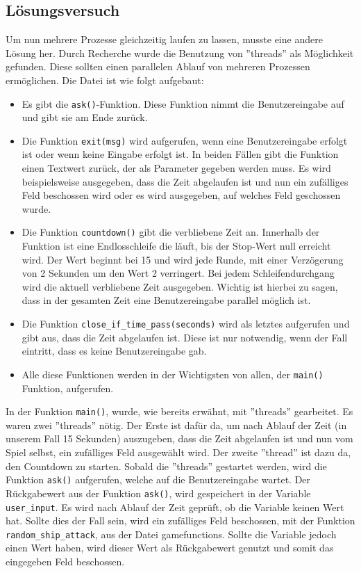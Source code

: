 \documentclass{article}
\begin{document}
\subsection{Lösungsversuch}
    Um nun mehrere Prozesse gleichzeitig laufen zu lassen, musste eine andere Lösung her. Durch Recherche wurde die Benutzung von ''threads'' als Möglichkeit gefunden. Diese sollten einen parallelen Ablauf von mehreren Prozessen ermöglichen. Die Datei ist wie folgt aufgebaut:
    \setlist{}%
\begin{itemize}
\itemsep0em
    \item
    Es gibt die \verb$ask()$-Funktion. Diese Funktion nimmt die Benutzereingabe auf und gibt sie am Ende zurück.
    \item
    Die Funktion \verb$exit(msg)$ wird aufgerufen, wenn eine Benutzereingabe erfolgt ist oder wenn keine Eingabe erfolgt ist. In beiden Fällen gibt die Funktion einen Textwert zurück, der als Parameter gegeben werden muss. Es wird beispielsweise ausgegeben, dass die Zeit abgelaufen ist und nun ein zufälliges Feld beschossen wird oder es wird ausgegeben, auf welches Feld geschossen wurde.
    \item
    Die Funktion \verb$countdown()$ gibt die verbliebene Zeit an. Innerhalb der Funktion ist eine Endlosschleife die läuft, bis der Stop-Wert null erreicht wird. Der Wert beginnt bei 15 und wird  jede Runde, mit einer Verzögerung von 2 Sekunden um den Wert 2 verringert. Bei jedem Schleifendurchgang wird die aktuell verbliebene Zeit ausgegeben. Wichtig  ist hierbei zu sagen, dass in der gesamten Zeit eine Benutzereingabe parallel möglich ist.
    \item
    Die Funktion \verb$close_if_time_pass(seconds)$ wird als letztes aufgerufen und gibt aus, dass die Zeit abgelaufen ist. Diese ist nur notwendig, wenn der Fall eintritt, dass es keine Benutzereingabe gab.
    \item
    Alle diese Funktionen werden in der Wichtigsten von allen, der \verb$main()$ Funktion, aufgerufen.
    \end{itemize}
    \par
    In der Funktion \verb$main()$, wurde, wie bereits erwähnt, mit ''threads'' gearbeitet. Es waren zwei ''threads'' nötig. Der Erste ist dafür da, um nach Ablauf der Zeit (in unserem Fall 15 Sekunden) auszugeben, dass die Zeit abgelaufen ist und nun vom Spiel selbst, ein zufälliges Feld ausgewählt wird. Der zweite ''thread'' ist dazu da, den Countdown zu starten. Sobald die ''threads'' gestartet werden, wird die Funktion \verb$ask()$ aufgerufen, welche auf die Benutzereingabe wartet. Der Rückgabewert aus der Funktion \verb$ask()$, wird gespeichert in der Variable \verb$user_input$. Es wird nach Ablauf der Zeit geprüft, ob die Variable keinen Wert hat. Sollte dies der Fall sein, wird ein zufälliges Feld beschossen, mit der Funktion \verb$random_ship_attack$, aus der Datei gamefunctions. Sollte die Variable jedoch einen Wert haben, wird dieser Wert als Rückgabewert genutzt und somit das eingegeben Feld beschossen.
\end{document}

